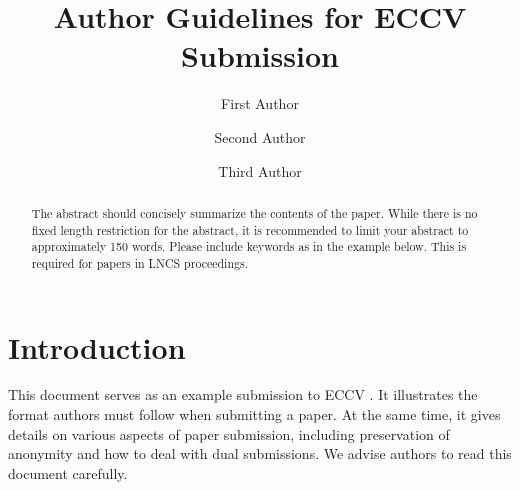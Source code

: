 \documentclass[runningheads]{llncs}
\begin{document}
\title{Author Guidelines for ECCV Submission} 


\author{First Author \and
Second Author \and
Third Author}



\maketitle


\begin{abstract}
  The abstract should concisely summarize the contents of the paper. 
  While there is no fixed length restriction for the abstract, it is recommended to limit your abstract to approximately 150 words.
  Please include keywords as in the example below. 
  This is required for papers in LNCS proceedings.
\end{abstract}


\section{Introduction}
\label{sec:intro}

This document serves as an example submission to ECCV \ECCVyear{}.
It illustrates the format authors must follow when submitting a paper. 
At the same time, it gives details on various aspects of paper submission, including preservation of anonymity and how to deal with dual submissions.
We advise authors to read this document carefully.
\end{document}
